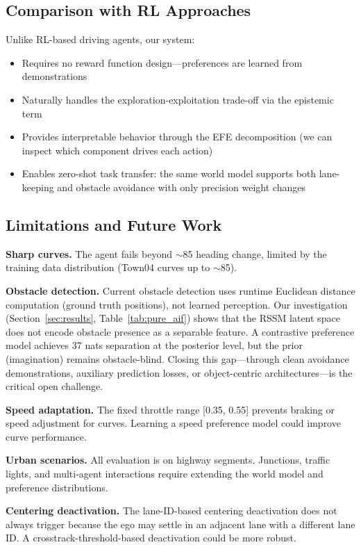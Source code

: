 \documentclass[conference]{IEEEtran}
\begin{document}
\subsection{Comparison with RL Approaches}

Unlike RL-based driving agents, our system:
\begin{itemize}
    \item Requires no reward function design---preferences are learned from demonstrations
    \item Naturally handles the exploration-exploitation trade-off via the epistemic term
    \item Provides interpretable behavior through the EFE decomposition (we can inspect which component drives each action)
    \item Enables zero-shot task transfer: the same world model supports both lane-keeping and obstacle avoidance with only precision weight changes
\end{itemize}

\subsection{Limitations and Future Work}

\textbf{Sharp curves.} The agent fails beyond $\sim$85\degree{} heading change, limited by the training data distribution (Town04 curves up to $\sim$85\degree{}).

\textbf{Obstacle detection.} Current obstacle detection uses runtime Euclidean distance computation (ground truth positions), not learned perception. Our investigation (Section~\ref{sec:results}, Table~\ref{tab:pure_aif}) shows that the RSSM latent space does not encode obstacle presence as a separable feature. A contrastive preference model achieves 37 nats separation at the posterior level, but the prior (imagination) remains obstacle-blind. Closing this gap---through clean avoidance demonstrations, auxiliary prediction losses, or object-centric architectures---is the critical open challenge.

\textbf{Speed adaptation.} The fixed throttle range [0.35, 0.55] prevents braking or speed adjustment for curves. Learning a speed preference model could improve curve performance.

\textbf{Urban scenarios.} All evaluation is on highway segments. Junctions, traffic lights, and multi-agent interactions require extending the world model and preference distributions.

\textbf{Centering deactivation.} The lane-ID-based centering deactivation does not always trigger because the ego may settle in an adjacent lane with a different lane ID. A crosstrack-threshold-based deactivation could be more robust.
\end{document}
